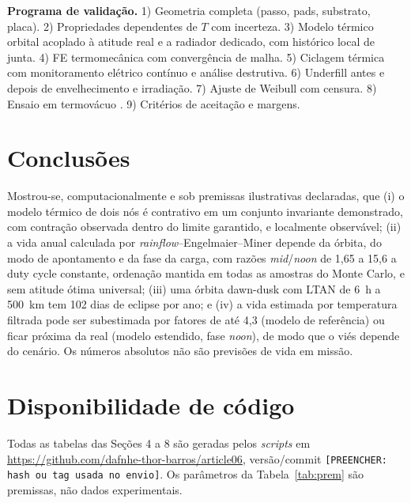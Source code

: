 \documentclass[12pt,a4paper]{article}
\newcommand{\repo}{\url{https://github.com/dafnhe-thor-barros/article06}}
\begin{document}
\textbf{Programa de validação.} 1) Geometria completa (passo, pads, substrato,
placa). 2) Propriedades dependentes de $T$ com incerteza. 3) Modelo térmico
orbital acoplado à atitude real e a radiador dedicado, com histórico local de
junta. 4) FE termomecânica com convergência de malha. 5) Ciclagem térmica com
monitoramento elétrico contínuo \cite{ipc9701} e análise destrutiva.
6) Underfill antes e depois de envelhecimento e irradiação. 7) Ajuste de
Weibull com censura. 8) Ensaio em termovácuo \cite{ecss7004}. 9) Critérios de
aceitação e margens.

\section{Conclusões}
Mostrou-se, computacionalmente e sob premissas ilustrativas declaradas, que
(i) o modelo térmico de dois nós é contrativo em um conjunto invariante
demonstrado, com contração observada dentro do limite garantido, e localmente
observável; (ii) a vida anual calculada por \emph{rainflow}--Engelmaier--Miner
depende da órbita, do modo de apontamento e da fase da carga, com razões
\emph{mid}/\emph{noon} de 1,65 a 15,6 a duty cycle constante, ordenação mantida
em todas as amostras do Monte Carlo, e sem atitude ótima universal; (iii) uma
órbita dawn-dusk com LTAN de 6~h a 500~km tem 102 dias de eclipse por ano; e
(iv) a vida estimada por temperatura filtrada pode ser subestimada por fatores
de até 4,3 (modelo de referência) ou ficar próxima da real (modelo estendido,
fase \emph{noon}), de modo que o viés depende do cenário. Os números absolutos
não são previsões de vida em missão.

\section*{Disponibilidade de código}
Todas as tabelas das Seções 4 a 8 são geradas pelos \textit{scripts} em
\repo{}, versão/commit \texttt{[PREENCHER: hash ou tag usada no envio]}. Os
parâmetros da Tabela~\ref{tab:prem} são premissas, não dados experimentais.
\end{document}
